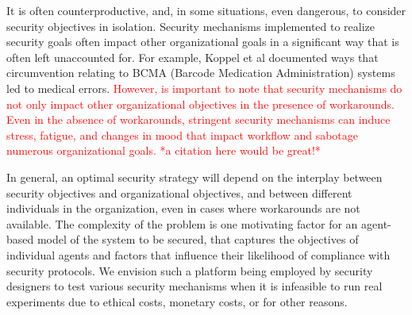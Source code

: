 \documentclass{acm_proc_article-sp}
\newcommand{\ignore}[1] {}
\begin{document}
\ignore{There's rarely any incentive for users to report the annoying security measures of a system if those very measures can easily be circumvented without consequences. If users were to complain about such a system and/or mention employed workarounds, e.g. by help desk calls, it is likely that system designers will just make the next iteration of the system more robust to circumvention. This is supported by a dialogue we had with a security practitioner from industry who stated: ``when we as security practitioners become aware of the unchecked circumvention taking place, we respond by tightening our controls even further, by being even more intrusive in order to prevent circumvention.'' On the other hand, if system designers are kept out of the loop, just as users are often kept out of the loop during the design of the system, then users can merrily employ their workarounds and do their job with minimal frustration. The punchline is that users don't complain, system designers continue to hold their flawed mental models which have not been updated, the security of the system is compromised, and the security and organizational goals are not met.}


It is often counterproductive, and, in some situations, even
dangerous, to consider security objectives in isolation. Security
mechanisms implemented to realize security goals often impact other
organizational goals in a significant way that is often left unaccounted for. 
For example, Koppel et al \cite{koppel2008workarounds} documented ways
that circumvention relating to BCMA (Barcode Medication
Administration) systems led to medical errors. \textcolor{red}{However, is important to note 
that security mechanisms do not only impact other organizational objectives 
in the presence of workarounds. Even in the absence of workarounds, 
stringent security mechanisms can induce stress, fatigue, and 
changes in mood that impact workflow and sabotage numerous 
organizational goals. *a citation here would be great!*}

\ignore{Even in situations where 
workarounds are not employed, medical errors 
may arise due to sincere attempts by clinicians to comply with a system 
that interferes with workflow.}

In general, an optimal security strategy will depend on the interplay
between security objectives and organizational objectives, and between
different individuals in the organization, even in cases where
workarounds are not available. The complexity of the problem is one
motivating factor for an agent-based model of the system to be
secured, that captures the objectives of individual agents and factors
that influence their likelihood of compliance with security
protocols. We envision such a platform being employed by security
designers to test various security mechanisms when it is infeasible to
run real experiments due to ethical costs, monetary costs, or for
other reasons.
\end{document}
